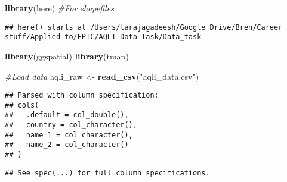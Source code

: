\documentclass[]{article}
\newenvironment{Shaded}{\begin{snugshade}}{\end{snugshade}}
\newcommand{\CommentTok}[1]{\textcolor[rgb]{0.56,0.35,0.01}{\textit{#1}}}
\newcommand{\KeywordTok}[1]{\textcolor[rgb]{0.13,0.29,0.53}{\textbf{#1}}}
\newcommand{\NormalTok}[1]{#1}
\newcommand{\StringTok}[1]{\textcolor[rgb]{0.31,0.60,0.02}{#1}}
\begin{document}
\begin{Shaded}
\begin{Highlighting}[]
\KeywordTok{library}\NormalTok{(here) }\CommentTok{#For shapefiles}
\end{Highlighting}
\end{Shaded}

\begin{verbatim}
## here() starts at /Users/tarajagadeesh/Google Drive/Bren/Career stuff/Applied to/EPIC/AQLI Data Task/Data_task
\end{verbatim}

\begin{Shaded}
\begin{Highlighting}[]
\KeywordTok{library}\NormalTok{(ggspatial)}
\KeywordTok{library}\NormalTok{(tmap)}

\CommentTok{#Load data}
\NormalTok{aqli_raw <-}\StringTok{ }\KeywordTok{read_csv}\NormalTok{(}\StringTok{"aqli_data.csv"}\NormalTok{) }
\end{Highlighting}
\end{Shaded}

\begin{verbatim}
## Parsed with column specification:
## cols(
##   .default = col_double(),
##   country = col_character(),
##   name_1 = col_character(),
##   name_2 = col_character()
## )
\end{verbatim}

\begin{verbatim}
## See spec(...) for full column specifications.
\end{verbatim}
\end{document}
